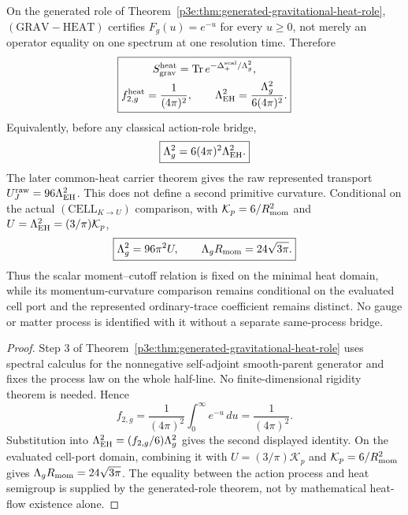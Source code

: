 \documentclass[12pt,a4paper]{article}
\begin{document}
\begin{corollary}
\label{p3e:cor:grav-heat-branch}
On the generated role of
Theorem~\ref{p3e:thm:generated-gravitational-heat-role},
\((\mathrm{GRAV\!-\!HEAT})\) certifies
\(F_g(u)=e^{-u}\) for every \(u\ge0\), not merely an operator equality on one
spectrum at one resolution time.  Therefore
\[
\boxed{
\begin{gathered}
 S_{\rm grav}^{\rm heat}
 =\operatorname{Tr}e^{-\Delta_+^{\rm scal}/\Lambda_g^2},\\
 f_{2,g}^{\rm heat}=\frac1{(4\pi)^2},\qquad
 \Lambda_{\rm EH}^2=\frac{\Lambda_g^2}{6(4\pi)^2}.
\end{gathered}}
\]
Equivalently, before any classical action-role bridge,
\[
 \boxed{\Lambda_g^2=6(4\pi)^2\Lambda_{\rm EH}^2.}
\]
The later common-heat carrier theorem gives the raw represented transport
\(U_{J}^{\rm raw}=96\Lambda_{\rm EH}^2\).  This does not define a second
primitive curvature.  Conditional on the actual $(\mathrm{CELL}_{K\to U})$ comparison,
with $\mathcal K_p=6/R_{\mathrm{mom}}^2$ and $U=\Lambda_{\rm EH}^2=(3/\pi)\mathcal K_p$,
\[
 \boxed{\Lambda_g^2=96\pi^2U,\qquad \Lambda_gR_{\mathrm{mom}}=24\sqrt{3\pi}.}
\]
Thus the scalar moment--cutoff relation is fixed on the minimal heat
domain, while its momentum-curvature comparison remains conditional on the
evaluated cell port and the represented ordinary-trace
coefficient remains distinct.  No gauge or matter
process is identified with it without a separate same-process bridge.
\end{corollary}

\begin{proof}
Step 3 of
Theorem~\ref{p3e:thm:generated-gravitational-heat-role} uses spectral
calculus for the nonnegative self-adjoint smooth-parent generator and fixes
the process law on the whole half-line.  No finite-dimensional rigidity
theorem is needed.  Hence
\[
 f_{2,g}
 =\frac1{(4\pi)^2}\int_0^\infty e^{-u}\,du
 =\frac1{(4\pi)^2}.
\]
Substitution into
\(\Lambda_{\rm EH}^2=(f_{2,g}/6)\Lambda_g^2\) gives the second displayed
identity.  On the evaluated cell-port domain, combining it with
\(U=(3/\pi)\mathcal K_p\) and \(\mathcal K_p=6/R_{\mathrm{mom}}^2\) gives
\(\Lambda_gR_{\mathrm{mom}}=24\sqrt{3\pi}\).  The equality between the action process and heat
semigroup is supplied by the generated-role theorem, not by mathematical
heat-flow existence alone.
\end{proof}
\end{document}
